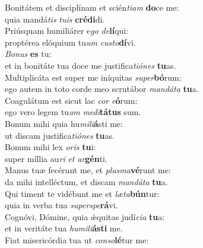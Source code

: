\evenverse Bonitátem et disciplínam et scién\textit{ti}\textit{am} \textbf{do}ce me:~\*\\
\evenverse quia mandá\textit{tis} \textit{tu}\textit{is} \textbf{cré}\textbf{di}di.\\
\oddverse Priúsquam humiliárer e\textit{go} \textit{de}\textbf{lí}qui:~\*\\
\oddverse proptérea elóquium tu\textit{um} \textit{cu}\textit{sto}\textbf{dí}vi.\\
\evenverse \textit{Bo}\textit{nus} \textbf{es} tu:~\*\\
\evenverse et in bonitáte tua doce me justifica\textit{ti}\textit{ó}\textit{nes} \textbf{tu}as.\\
\oddverse Multiplicáta est super me iníquitas \textit{su}\textit{per}\textbf{bó}rum:~\*\\
\oddverse ego autem in toto corde meo scrutábor \textit{man}\textit{dá}\textit{ta} \textbf{tu}a.\\
\evenverse Coagulátum est sicut lac \textit{cor} \textit{e}\textbf{ó}rum:~\*\\
\evenverse ego vero legem tu\textit{am} \textit{me}\textit{di}\textbf{tá}\textbf{tus} sum.\\
\oddverse Bonum mihi quia hu\textit{mi}\textit{li}\textbf{á}sti me:~\*\\
\oddverse ut discam justifica\textit{ti}\textit{ó}\textit{nes} \textbf{tu}as.\\
\evenverse Bonum mihi lex \textit{o}\textit{ris} \textbf{tu}i:~\*\\
\evenverse super míllia au\textit{ri} \textit{et} \textit{ar}\textbf{gén}ti.\\
\oddverse Manus tuæ fecérunt me, et \textit{plas}\textit{ma}\textbf{vé}runt me:~\*\\
\oddverse da mihi intelléctum, et discam \textit{man}\textit{dá}\textit{ta} \textbf{tu}a.\\
\evenverse Qui timent te vidébunt me et \textit{læ}\textit{ta}\textbf{bún}tur:~\*\\
\evenverse quia in verba tua \textit{su}\textit{per}\textit{spe}\textbf{rá}vi.\\
\oddverse Cognóvi, Dómine, quia ǽquitas judí\textit{ci}\textit{a} \textbf{tu}a:~\*\\
\oddverse et in veritáte tua \textit{hu}\textit{mi}\textit{li}\textbf{á}\textbf{sti} me.\\
\evenverse Fiat misericórdia tua ut \textit{con}\textit{so}\textbf{lé}tur me:~\*\\
